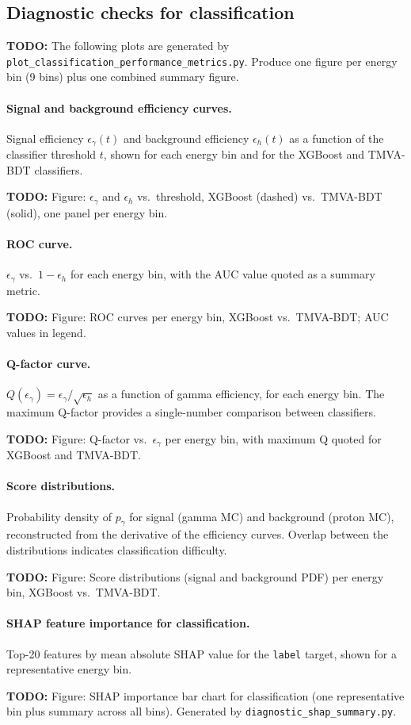 \documentclass[12pt]{article}
\newcommand{\todo}[1]{\begin{hintBox} \textbf{TODO:} #1 \end{hintBox}}
\begin{document}
\subsection{Diagnostic checks for classification}

\todo{The following plots are generated by \texttt{plot\_classification\_performance\_metrics.py}. Produce one figure per energy bin (9 bins) plus one combined summary figure.}

\paragraph{Signal and background efficiency curves.}
Signal efficiency $\epsilon_\gamma(t)$ and background efficiency $\epsilon_h(t)$
as a function of the classifier threshold $t$,
shown for each energy bin and for the XGBoost and TMVA-BDT classifiers.
\todo{Figure: $\epsilon_\gamma$ and $\epsilon_h$ vs.\ threshold, XGBoost (dashed) vs.\ TMVA-BDT (solid), one panel per energy bin.}

\paragraph{ROC curve.}
$\epsilon_\gamma$ vs.\ $1 - \epsilon_h$ for each energy bin,
with the AUC value quoted as a summary metric.
\todo{Figure: ROC curves per energy bin, XGBoost vs.\ TMVA-BDT; AUC values in legend.}

\paragraph{Q-factor curve.}
$Q(\epsilon_\gamma) = \epsilon_\gamma / \sqrt{\epsilon_h}$ as a function of gamma efficiency,
for each energy bin.
The maximum Q-factor provides a single-number comparison between classifiers.
\todo{Figure: Q-factor vs.\ $\epsilon_\gamma$ per energy bin, with maximum Q quoted for XGBoost and TMVA-BDT.}

\paragraph{Score distributions.}
Probability density of $p_\gamma$ for signal (gamma MC) and background (proton MC),
reconstructed from the derivative of the efficiency curves.
Overlap between the distributions indicates classification difficulty.
\todo{Figure: Score distributions (signal and background PDF) per energy bin, XGBoost vs.\ TMVA-BDT.}

\paragraph{SHAP feature importance for classification.}
Top-20 features by mean absolute SHAP value for the \texttt{label} target,
shown for a representative energy bin.
\todo{Figure: SHAP importance bar chart for classification (one representative bin plus summary across all bins). Generated by \texttt{diagnostic\_shap\_summary.py}.}
\end{document}
